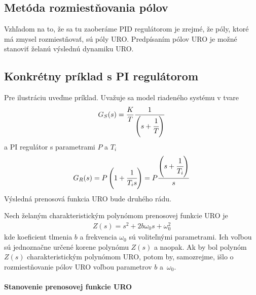 \documentclass[a4paper, 10pt, ]{article}
\begin{document}
\subsection{Metóda rozmiestňovania pólov}
\label{Metóda rozmiestňovania pólov}

Vzhľadom na to, že sa tu zaoberáme PID regulátorom je zrejmé, že póly, ktoré má zmysel rozmiestňovať, sú póly URO. Predpísaním pólov URO je možné stanoviť želanú výslednú dynamiku URO.


\subsection{Konkrétny príklad s PI regulátorom}

Pre ilustráciu uveďme príklad. Uvažuje sa model riadeného systému v tvare
\begin{align}
    G_S(s) = \frac{K}{T} \frac{1}{ \left(s+\cfrac{1}{T}\right)}
\end{align}
a PI regulátor s parametrami $P$ a $T_i$ 
\begin{align}
    G_R(s) = P \left( 1 + \cfrac{1}{T_i s}\right) = P \frac{ \left(s+\cfrac{1}{T_i}\right) }{s}
\end{align}
Výsledná prenosová funkcia URO bude druhého rádu. 

Nech želaným charakteristickým polynómom prenosovej funkcie URO je
\begin{align}
    Z(s) = s^2 + 2 b \omega_0 s + \omega_0^2
\end{align}
kde koeficient tlmenia $b$ a frekvencia $\omega_0$ sú voliteľnými parametrami. Ich voľbou sú jednoznačne určené korene polynómu $Z(s)$ a naopak. Ak by bol polynóm $Z(s)$ charakteristickým polynómom URO, potom by, samozrejme, išlo o rozmiestňovanie pólov URO voľbou parametrov $b$ a~$\omega_0$.







\paragraph{Stanovenie prenosovej funkcie URO}
\end{document}
